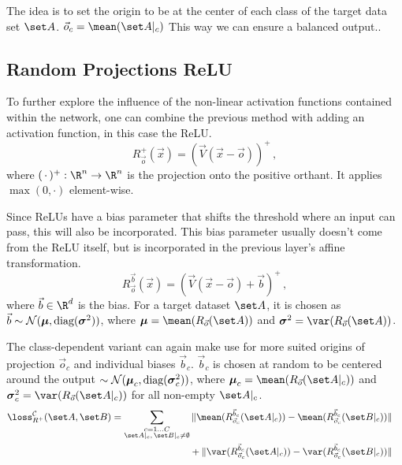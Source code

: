 The idea is to set the origin to be at the center of each class of the target data set $\set A$. $\vec o_c = \mean ({\set A|_c})$
This way we can ensure a balanced output..



\subsection{Random Projections ReLU}
To further explore the influence of the non-linear activation functions contained within the network,
one can combine the previous method with adding an activation function, in this case the ReLU.
% 
\[
    R_{\vec o}^+ (\vec x) = (\vec V (\vec x - \vec o))^+ \,,
\]
where $(\,\cdot\,)^+ :\R^n \to \R^n$ is the projection onto the positive orthant. It applies $\max(0, \cdot)$ element-wise.

Since ReLUs have a bias parameter that shifts the threshold where an input can pass, this will also be incorporated.
This bias parameter usually doesn't come from the ReLU itself, but is incorporated in the previous layer's affine transformation.
\[
    R_{\vec o}^{\vec b} (\vec x) = (\vec V (\vec x - \vec o) + \vec b)^+ \,,
\]
where $\vec b \in \R^d$ is the bias. For a target dataset $\set A$, it is chosen as $\vec b \sim \mathcal N(\boldsymbol \mu, \textnormal{diag}(\boldsymbol \sigma ^2))$, 
where $\boldsymbol \mu = \mean ({R_{\vec o}(\set A)})$ and $\boldsymbol \sigma ^2 = \var ({R_{\vec o}(\set A)})$.

The class-dependent variant can again make use for more suited origins of projection $\vec o_c$ and individual biases $\vec b_c$.
$\vec b_c$ is chosen at random to be centered around the output $\sim \mathcal N(\boldsymbol \mu_c, \textnormal{diag}(\boldsymbol \sigma _c^2))$, 
where $\boldsymbol \mu_c = \mean ({R_{\vec o}(\set A|_c)})$ and $\boldsymbol \sigma_c ^2 = \var ({R_{\vec o}(\set A|_c)})$ for all non-empty $\set A|_c$.
% 
\begin{align*}
    \loss _{R^+} ^{\mathcal C} (\set A, \set B) &=
    \begin{aligned}[t]
        \sum _{\substack{c = 1 \dots C \\ \set A|_c ,\, \set B|_c \neq \emptyset}} 
        \|\mean ({R_{\vec o_c}^{\vec b_c} (\set A|_c)}) - \mean ({R_{\vec o_c}^{\vec b_c} (\set B|_c)})\| \\
        {} + \|\var ({R_{\vec o_c}^{\vec b_c} (\set A|_c)}) - \var ({R_{\vec o_c}^{\vec b_c} (\set B|_c)}) \| 
    \end{aligned}
\end{align*}

